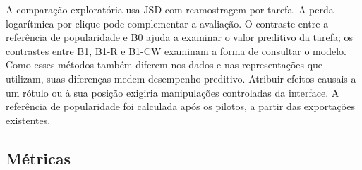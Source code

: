 \documentclass[12pt]{article}
\begin{document}
A comparação exploratória usa JSD com reamostragem por tarefa. A perda logarítmica por clique pode complementar a avaliação. O contraste entre a referência de popularidade e B0 ajuda a examinar o valor preditivo da tarefa; os contrastes entre B1, B1-R e B1-CW examinam a forma de consultar o modelo. Como esses métodos também diferem nos dados e nas representações que utilizam, suas diferenças medem desempenho preditivo. Atribuir efeitos causais a um rótulo ou à sua posição exigiria manipulações controladas da interface. A referência de popularidade foi calculada após os pilotos, a partir das exportações existentes.

\subsection{Métricas}
\label{sec:metricas}
\end{document}
